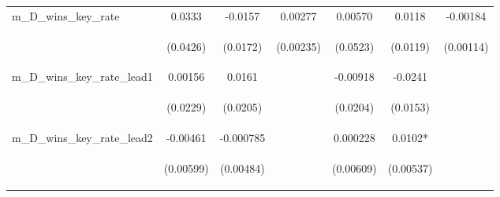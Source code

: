 \documentclass[]{article}
\begin{document}
\begin{center}
\begin{tabular}{lcccccc}
m\_D\_wins\_key\_rate & 0.0333 & -0.0157 & 0.00277 & 0.00570 & 0.0118 & -0.00184 \\
\vspace{4pt} & \begin{footnotesize}(0.0426)\end{footnotesize} & \begin{footnotesize}(0.0172)\end{footnotesize} & \begin{footnotesize}(0.00235)\end{footnotesize} & \begin{footnotesize}(0.0523)\end{footnotesize} & \begin{footnotesize}(0.0119)\end{footnotesize} & \begin{footnotesize}(0.00114)\end{footnotesize} \\
m\_D\_wins\_key\_rate\_lead1 & 0.00156 & 0.0161 &  & -0.00918 & -0.0241 &  \\
\vspace{4pt} & \begin{footnotesize}(0.0229)\end{footnotesize} & \begin{footnotesize}(0.0205)\end{footnotesize} & \begin{footnotesize}\end{footnotesize} & \begin{footnotesize}(0.0204)\end{footnotesize} & \begin{footnotesize}(0.0153)\end{footnotesize} & \begin{footnotesize}\end{footnotesize} \\
m\_D\_wins\_key\_rate\_lead2 & -0.00461 & -0.000785 &  & 0.000228 & 0.0102* &  \\
\vspace{4pt} & \begin{footnotesize}(0.00599)\end{footnotesize} & \begin{footnotesize}(0.00484)\end{footnotesize} & \begin{footnotesize}\end{footnotesize} & \begin{footnotesize}(0.00609)\end{footnotesize} & \begin{footnotesize}(0.00537)\end{footnotesize} & \begin{footnotesize}\end{footnotesize} \\

\end{tabular}
\end{center}
\end{document}
